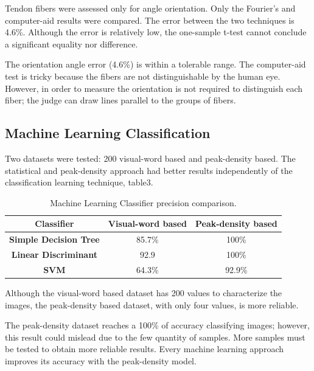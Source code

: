 \documentclass[12pt,a4paper]{article}
\begin{document}
Tendon fibers were assessed only for angle orientation. Only the Fourier’s and computer-aid results were compared. The error between the two techniques is 4.6\%. Although the error is relatively low, the one-sample t-test cannot conclude a significant equality nor difference.

The orientation angle error (4.6\%) is within a tolerable range. The computer-aid test is tricky because the fibers are not distinguishable by the human eye. However, in order to measure the orientation is not required to distinguish each fiber; the judge can draw lines parallel to the groups of fibers.

\subsection{Machine Learning Classification}

Two datasets were tested: 200 visual-word based and peak-density based. The  statistical and peak-density approach had better results independently of the classification learning technique, table3.


\begin {table}[H]
\begin{center}
\begin{tabular}{ |c|c|c| }
\hline
  \bf{Classifier} & \bf{Visual-word based} & \bf{Peak-density based} \\
 \hline
 \bf{Simple Decision Tree} & 85.7\% & 100\% \\ 
 \hline
 \bf{Linear Discriminant} & 92.9 & 100\%  \\ 
 \hline
 \bf{SVM} & 64.3\% & 92.9\%  \\ 
\hline    
\end{tabular}
\caption {Machine Learning Classifier precision comparison.}
\footnotesize
\begin{flushleft}
Although the visual-word based dataset has 200 values to characterize the images, the peak-density based dataset, with only four values, is more reliable. 
\end{flushleft}

\end{center} 
\end {table}

The peak-density dataset reaches a 100\% of accuracy classifying images; however, this result could mislead due to the few quantity of samples. More samples must be tested to obtain more reliable results. Every machine learning approach improves its accuracy with the peak-density model. 
\end{document}
